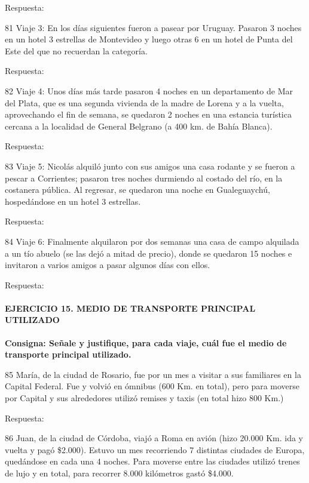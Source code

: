 \documentclass[
  openany]{book}
\begin{document}
Respuesta:

81 Viaje 3: En los días siguientes fueron a pasear por Uruguay. Pasaron 3 noches en un hotel 3 estrellas de Montevideo y luego otras 6 en un hotel de Punta del Este del que no recuerdan la categoría.

Respuesta:

82 Viaje 4: Unos días más tarde pasaron 4 noches en un departamento de Mar del Plata, que es una segunda vivienda de la madre de Lorena y a la vuelta, aprovechando el fin de semana, se quedaron 2 noches en una estancia turística cercana a la localidad de General Belgrano (a 400 km. de Bahía Blanca).

Respuesta:

83 Viaje 5: Nicolás alquiló junto con sus amigos una casa rodante y se fueron a pescar a Corrientes; pasaron tres noches durmiendo al costado del río, en la costanera pública. Al regresar, se quedaron una noche en Gualeguaychú, hospedándose en un hotel 3 estrellas.

Respuesta:

84 Viaje 6: Finalmente alquilaron por dos semanas una casa de campo alquilada a un tío abuelo (se las dejó a mitad de precio), donde se quedaron 15 noches e invitaron a varios amigos a pasar algunos días con ellos.

Respuesta:

\hypertarget{ejercicio-15.-medio-de-transporte-principal-utilizado}{%
\paragraph{\texorpdfstring{\textbf{EJERCICIO 15. MEDIO DE TRANSPORTE PRINCIPAL UTILIZADO}}{EJERCICIO 15. MEDIO DE TRANSPORTE PRINCIPAL UTILIZADO}}\label{ejercicio-15.-medio-de-transporte-principal-utilizado}}

\textbf{Consigna: Señale y justifique, para cada viaje, cuál fue el medio de transporte principal utilizado.}

85 María, de la ciudad de Rosario, fue por un mes a visitar a sus familiares en la Capital Federal. Fue y volvió en ómnibus (600 Km. en total), pero para moverse por Capital y sus alrededores utilizó remises y taxis (en total hizo 800 Km.)

Respuesta:

86 Juan, de la ciudad de Córdoba, viajó a Roma en avión (hizo 20.000 Km. ida y vuelta y pagó \$2.000). Estuvo un mes recorriendo 7 distintas ciudades de Europa, quedándose en cada una 4 noches. Para moverse entre las ciudades utilizó trenes de lujo y en total, para recorrer 8.000 kilómetros gastó \$4.000.
\end{document}
